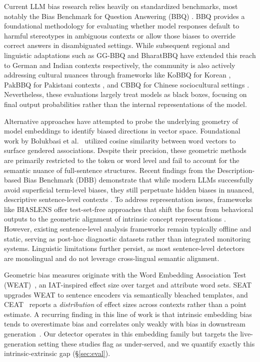 \documentclass[runningheads]{llncs}
\begin{document}
Current LLM bias research relies heavily on standardized benchmarks, most notably the Bias Benchmark for Question Answering (BBQ) \cite{parrish-etal-2022-bbq}. BBQ provides a foundational methodology for evaluating whether model responses default to harmful stereotypes in ambiguous contexts or allow those biases to override correct answers in disambiguated settings. While subsequent regional and linguistic adaptations such as GG-BBQ \cite{satheesh2025gg} and BharatBBQ \cite{tomar2025bharatbbq} have extended this reach to German and Indian contexts respectively, the community is also actively addressing cultural nuances through frameworks like KoBBQ for Korean \cite{jin2024kobbq}, PakBBQ for Pakistani contexts \cite{hashmat2025pakbbq}, and CBBQ for Chinese sociocultural settings \cite{huang2024cbbq}. Nevertheless, these evaluations largely treat models as black boxes, focusing on final output probabilities rather than the internal representations of the model.

Alternative approaches have attempted to probe the underlying geometry of model embeddings to identify biased directions in vector space. Foundational work by Bolukbasi et al.\ \cite{bolukbasi2016man} utilized cosine similarity between word vectors to surface gendered associations. Despite their precision, these geometric methods are primarily restricted to the token or word level and fail to account for the semantic nuance of full-sentence structures. Recent findings from the Description-based Bias Benchmark (DBB) demonstrate that while modern LLMs successfully avoid superficial term-level biases, they still perpetuate hidden biases in nuanced, descriptive sentence-level contexts \cite{dbb2025}. To address representation issues, frameworks like BIASLENS offer test-set-free approaches that shift the focus from behavioral outputs to the geometric alignment of intrinsic concept representations \cite{majali2025biaslens}. However, existing sentence-level analysis frameworks remain typically offline and static, serving as post-hoc diagnostic datasets rather than integrated monitoring systems. Linguistic limitations further persist, as most sentence-level detectors are monolingual and do not leverage cross-lingual semantic alignment.

Geometric bias measures originate with the Word Embedding Association Test (WEAT)~\cite{caliskan2017}, an IAT-inspired effect size over target and attribute word sets. SEAT~\cite{may2019} upgrades WEAT to sentence encoders via semantically bleached templates, and CEAT~\cite{guo2021ceat} reports a \emph{distribution} of effect sizes across contexts rather than a point estimate. A recurring finding in this line of work is that intrinsic embedding bias tends to overestimate bias and correlates only weakly with bias in downstream generation~\cite{gallegos2024,delobelle2022}. Our detector operates in this embedding family but targets the live-generation setting these studies flag as under-served, and we quantify exactly this intrinsic-extrinsic gap (\S\ref{sec:eval}).
\end{document}
